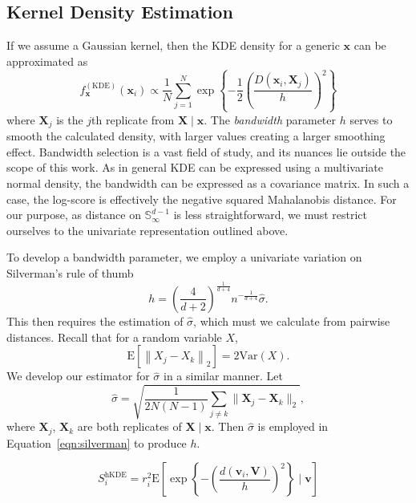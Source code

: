 \subsection{Kernel Density Estimation}

If we assume a Gaussian kernel, then the KDE density for a generic $\bm{x}$ can 
  be approximated as 
  \begin{equation}
    \label{eq:ad_kde}
    f_{\bm{x}}^{(\text{KDE})}(\bm{x}_i) \propto 
    \frac{1}{N}\sum_{j = 1}^{N}\exp
    \left\lbrace-\frac{1}{2}\left(\frac{D(\bm{x}_i,\bm{X}_j)}{h}\right)^2\right\rbrace
  \end{equation}
  where $\bm{X}_j$ is the $j$th 
  replicate from $\bm{X}\mid\bm{x}$.  The \emph{bandwidth} parameter $h$ serves to smooth
  the calculated density, with larger values creating a larger smoothing effect.
  Bandwidth selection is a vast field of study, and its nuances lie outside the
  scope of this work.  As in general KDE can be expressed using a multivariate normal density,
  the bandwidth can be expressed as a covariance matrix.  In such a case, the log-score
  is effectively the negative squared Mahalanobis distance.  For our purpose, as 
  distance on $\mathbb{S}_{\infty}^{d-1}$ is less straightforward, we must restrict 
  ourselves to the univariate representation outlined above.

To develop a bandwidth parameter, we employ a univariate variation on Silverman's 
  rule of thumb
  \begin{equation}
    \label{eqn:silverman}
    h = \left(\frac{4}{d+2}\right)^{\frac{1}{d+4}}n^{-\frac{1}{d+4}}\hat{\sigma}.
  \end{equation}
  This then requires the estimation of $\hat{\sigma}$, which must we calculate from 
  pairwise distances. Recall that for a random variable $X$, 
  \[ \text{E}\left[\left\lVert X_j - X_k\right\rVert_2\right] = 2\text{Var}(X). \]
  We develop our estimator for $\hat{\sigma}$ in a similar manner.  Let
  \[
    \hat{\sigma} = \sqrt{\frac{1}{2N(N-1)}\sum_{j\neq k}\lVert \bm{X}_j - \bm{X}_k\rVert_2},
  \]
  where $\bm{X}_j$, $\bm{X}_k$ are both replicates of $\bm{X}\mid\bm{x}$. Then 
  $\hat{\sigma}$ is employed in Equation~\ref{eqn:silverman} to produce $h$.
 
\begin{equation}
    \label{eqn:ad_kde_h}
    S_i^{\text{hKDE}} = r_i^{2}\text{E}\left[\exp\left\lbrace -
    \left(\frac{d(\bm{v}_i,\bm{V})}{h}\right)^2\right\rbrace\mid\bm{v}\right]
\end{equation}

